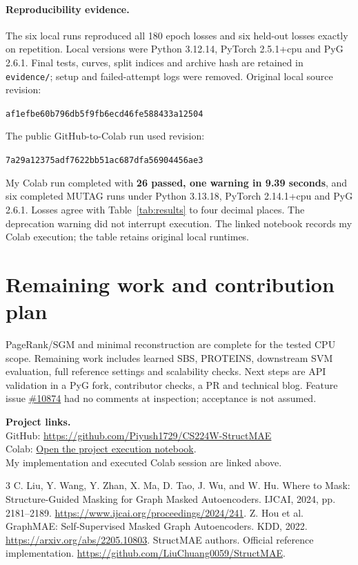 \documentclass{article}
\begin{document}
\paragraph{Reproducibility evidence.}
The six local runs reproduced all 180 epoch losses and six held-out losses exactly on repetition. Local versions were Python 3.12.14, PyTorch 2.5.1+cpu and PyG 2.6.1. Final tests, curves, split indices and archive hash are retained in \texttt{evidence/}; setup and failed-attempt logs were removed. Original local source revision:
\begin{center}\footnotesize\texttt{af1efbe60b796db5f9fb6ecd46fe588433a12504}\end{center}
The public GitHub-to-Colab run used revision:
\begin{center}\footnotesize\texttt{7a29a12375adf7622bb51ac687dfa56904456ae3}\end{center}
My Colab run completed with \textbf{26 passed, one warning in 9.39 seconds}, and six completed MUTAG runs under Python 3.13.18, PyTorch 2.14.1+cpu and PyG 2.6.1. Losses agree with Table~\ref{tab:results} to four decimal places. The deprecation warning did not interrupt execution. The linked notebook records my Colab execution; the table retains original local runtimes.

\section{Remaining work and contribution plan}
PageRank/SGM and minimal reconstruction are complete for the tested CPU scope. Remaining work includes learned SBS, PROTEINS, downstream SVM evaluation, full reference settings and scalability checks. Next steps are API validation in a PyG fork, contributor checks, a PR and technical blog. Feature issue \href{https://github.com/pyg-team/pytorch_geometric/issues/10874}{\#10874} had no comments at inspection; acceptance is not assumed.

\noindent\textbf{Project links.}\\
GitHub: \url{https://github.com/Piyush1729/CS224W-StructMAE}\\
Colab: \href{https://colab.research.google.com/drive/1JA-mS6bwwKbfHbgyCNB4O1AE9OI_sVV2?usp=sharing}{Open the project execution notebook}.\\
My implementation and executed Colab session are linked above.

\begin{thebibliography}{3}\footnotesize
{} C. Liu, Y. Wang, Y. Zhan, X. Ma, D. Tao, J. Wu, and W. Hu.
Where to Mask: Structure-Guided Masking for Graph Masked Autoencoders.
IJCAI, 2024, pp. 2181--2189. \url{https://www.ijcai.org/proceedings/2024/241}.
 Z. Hou et al. GraphMAE: Self-Supervised Masked Graph Autoencoders. KDD, 2022. \url{https://arxiv.org/abs/2205.10803}.
 StructMAE authors. Official reference implementation.
\url{https://github.com/LiuChuang0059/StructMAE}.
\end{thebibliography}
\end{document}
